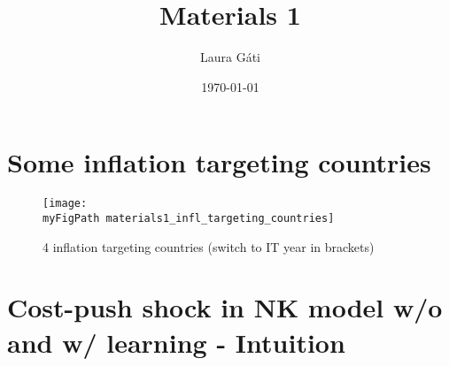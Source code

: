 \documentclass[11pt]{article}
\def \myFigPath {../figures/}
\renewcommand{\[}{\begin{equation}}
\renewcommand{\]}{\end{equation}}
\def\myBiggerFigScale{0.4}
\begin{document}
\linespread{1.0}

\title{Materials 1}
\author{Laura G\'ati} 
\date{\today}
\maketitle


\tableofcontents



\section{Some inflation targeting countries}
\begin{figure}[h!]
\caption{4 inflation targeting countries (switch to IT year in brackets)}
\centering
\texttt{[image: \\myFigPath materials1\_infl\_targeting\_countries]}
\end{figure}

\newpage
\section{Cost-push shock in NK model w/o and w/ learning - Intuition}
\end{document}
